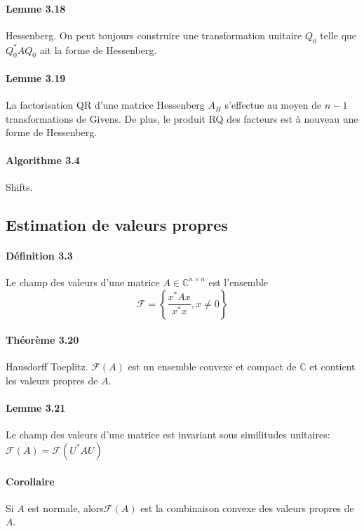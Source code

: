 \paragraph{Lemme 3.18} Hessenberg. On peut toujours construire une transformation unitaire $Q_0$ telle que $Q_0^* A Q_0$ ait la forme de Hessenberg.

\paragraph{Lemme 3.19} La factorisation QR d'une matrice Hessenberg $A_H$ s'effectue au moyen de $n-1$ transformations de Givens. De plus, le produit RQ des facteurs est à nouveau une forme de Hessenberg.

\paragraph{Algorithme 3.4} Shifts.

\subsection{Estimation de valeurs propres}

\paragraph{Définition 3.3} Le champ des valeurs d'une matrice $A\in \mathbb{C}^{n\times n}$ est l'ensemble
$$\mathcal{F} = \left\lbrace \frac{x^* A x}{x^*x}, x \neq 0 \right\rbrace$$

\paragraph{Théorème 3.20} Hausdorff Toeplitz. $\mathcal{F}(A)$ est un ensemble convexe et compact de $\mathbb{C}$ et contient les valeurs propres de $A$.

\paragraph{Lemme 3.21} Le champ des valeurs d'une matrice est invariant sous similitudes unitaires: $\mathcal{F}(A) = \mathcal{F}(U^*AU)$

\paragraph{Corollaire} Si $A$ est normale, alors$\mathcal{F}(A)$ est la combinaison convexe des valeurs propres de $A$.

